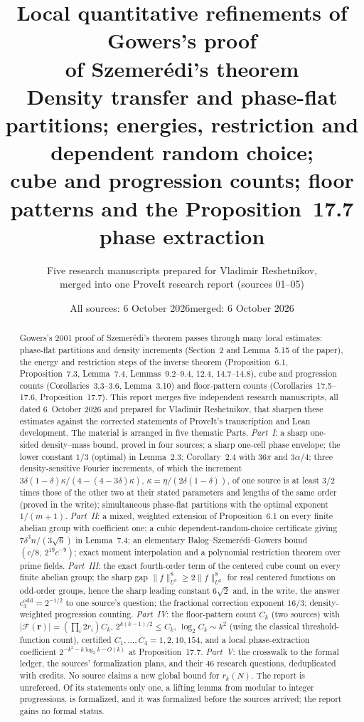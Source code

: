 \documentclass[11pt,letterpaper]{article}
\title{\textbf{Local quantitative refinements of Gowers's proof\\ of Szemer\'edi's theorem}\\[7pt]
\large Density transfer and phase-flat partitions; energies, restriction and dependent random choice;\\ cube and progression counts; floor patterns and the Proposition~17.7 phase extraction}
\author{Five research manuscripts prepared for Vladimir Reshetnikov,\\ merged into one ProveIt research report (sources 01--05)}
\date{All sources: 6 October 2026\quad merged: 6 October 2026}
\numberwithin{equation}{section}
\theoremstyle{definition}
\theoremstyle{remark}
\newcommand{\1}{\mathbf 1}
\begin{document}
\hypersetup{pageanchor=false}
\maketitle
\begin{abstract}
Gowers's 2001 proof of Szemer\'edi's theorem passes through many local estimates: phase-flat partitions and density increments (Section~2 and Lemma~5.15 of the paper), the energy and restriction steps of the inverse theorem (Proposition~6.1, Proposition~7.3, Lemma~7.4, Lemmas~9.2--9.4, 12.4, 14.7--14.8), cube and progression counts (Corollaries~3.3--3.6, Lemma~3.10) and floor-pattern counts (Corollaries~17.5--17.6, Proposition~17.7). This report merges five independent research manuscripts, all dated 6~October 2026 and prepared for Vladimir Reshetnikov, that sharpen these estimates against the corrected statements of ProveIt's transcription and Lean development. The material is arranged in five thematic Parts. \emph{Part~I}: a sharp one-sided density--mass bound, proved in four sources; a sharp one-cell phase envelope; the lower constant $1/3$ (optimal) in Lemma~2.3; Corollary~2.4 with $36\pi$ and $3\alpha/4$; three density-sensitive Fourier increments, of which the increment $3\delta(1-\delta)\kappa/(4-(4-3\delta)\kappa)$, $\kappa=\eta/(2\delta(1-\delta))$, of one source is at least $3/2$ times those of the other two at their stated parameters and lengths of the same order (proved in the write); simultaneous phase-flat partitions with the optimal exponent $1/(m+1)$. \emph{Part~II}: a mixed, weighted extension of Proposition~6.1 on every finite abelian group with coefficient one; a cubic dependent-random-choice certificate giving $7\delta^3n/(3\sqrt6)$ in Lemma~7.4; an elementary Balog--Szemer\'edi--Gowers bound $(c/8,\,2^{19}c^{-9})$; exact moment interpolation and a polynomial restriction theorem over prime fields. \emph{Part~III}: the exact fourth-order term of the centered cube count on every finite abelian group; the sharp gap $\|f\|_{U^3}^8\ge2\|f\|_{U^2}^8$ for real centered functions on odd-order groups, hence the sharp leading constant $6\sqrt2$ and, in the write, the answer $c_3^{\mathrm{odd}}=2^{-1/2}$ to one source's question; the fractional correction exponent $16/3$; density-weighted progression counting. \emph{Part~IV}: the floor-pattern count $C_k$ (two sources) with $|\mathcal F(\mathbf r)|=(\prod_i2r_i)C_k$, $2^{k(k-1)/2}\le C_k$, $\log_2C_k\sim k^2$ (using the classical threshold-function count), certified $C_1,\ldots,C_4=1,2,10,154$, and a local phase-extraction coefficient $2^{-k^2-k\log_2k-O(k)}$ at Proposition~17.7. \emph{Part~V}: the crosswalk to the formal ledger, the sources' formalization plans, and their 46 research questions, deduplicated with credits. No source claims a new global bound for $r_k(N)$. The report is unrefereed. Of its statements only one, a lifting lemma from modular to integer progressions, is formalized, and it was formalized before the sources arrived; the report gains no formal status.
\end{abstract}
\hypersetup{pageanchor=true}
{\small\setlength{\parskip}{0pt}\tableofcontents}
\newpage
\end{document}
